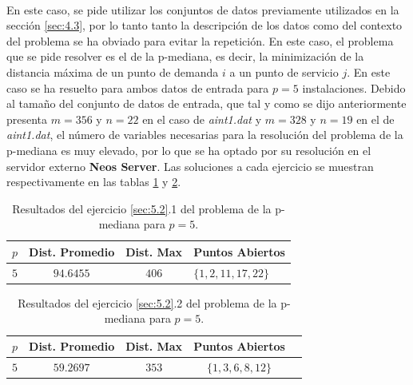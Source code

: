 \documentclass[spanish]{article}
\begin{document}
			\paragraph{}
			En este caso, se pide utilizar los conjuntos de datos previamente utilizados en la sección \ref{sec:4.3}, por lo tanto tanto la descripción de los datos como del contexto del problema se ha obviado para evitar la repetición. En este caso, el problema que se pide resolver es el de la p-mediana, es decir, la minimización de la distancia máxima de un punto de demanda $i$ a un punto de servicio $j$. En este caso se ha resuelto para ambos datos de entrada para $p = 5$ instalaciones. Debido al tamaño del conjunto de datos de entrada, que tal y como se dijo anteriormente presenta $m = 356$ y $n = 22$ en el caso de \emph{aint1.dat} y $m = 328 $ y $n = 19$ en el de \emph{aint1.dat}, el número de variables necesarias para la resolución del problema de la p-mediana es muy elevado, por lo que se ha optado por su resolución en el servidor externo \textbf{Neos Server}\cite{tool:neos-server}. Las soluciones a cada ejercicio se muestran respectivamente en las tablas \ref{table:sol-5.2.1} y \ref{table:sol-5.2.2}.


			\begin{table}[h]
				\begin{center}
					\begin{tabular}{|c || c || c || l | }
						\hline
						$p$ 	& Dist. Promedio	&	Dist. Max & Puntos Abiertos	 \\ \hline \hline
						$5$		& $94.6455$				&	$406$					& $\{1,2,11,17,22\}$ \\
						\hline
					\end{tabular}
				\end{center}
				\caption{Resultados del ejercicio \ref{sec:5.2}.1 del problema de la p-mediana para $p=5$.}
				\label{table:sol-5.2.1}
			\end{table}

			\begin{table}[h]
				\begin{center}
					\begin{tabular}{|c || c || c || c || l | }
						\hline
						$p$ 	& Dist. Promedio	&	Dist. Max & Puntos Abiertos	 \\ \hline \hline
						$5$		& $59.2697$				&	$353$					& $\{1,3,6,8,12\}$ \\
						\hline
					\end{tabular}
				\end{center}
				\caption{Resultados del ejercicio \ref{sec:5.2}.2 del problema de la p-mediana para $p=5$.}
				\label{table:sol-5.2.2}
			\end{table}
\end{document}
